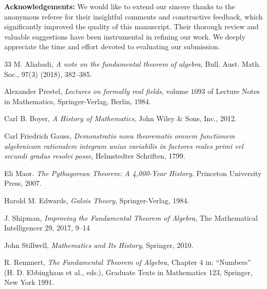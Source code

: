 \documentclass[sn-mathphys-num]{sn-jnl}%
\begin{document}
\noindent 
\textbf{Acknowledgements:} We would like to extend our sincere thanks to the anonymous referee for their insightful comments and constructive feedback, which significantly improved the quality of this manuscript. Their thorough review and valuable suggestions have been instrumental in refining our work. We deeply appreciate the time and effort devoted to evaluating our submission.

\begin{thebibliography}{33}
 M. Aliabadi, {\it A note on the fundamental theorem of algebra}, Bull. Aust. Math. Soc., 97(3) (2018), 382–385.

 Alexander Prestel, {\it Lectures on formally real fields}, volume $1093$ of Lecture Notes in Mathematics, Springer-Verlag, Berlin, $1984$.

 Carl B. Boyer, {\it A History of Mathematics}, John Wiley \& Sons, Inc., 2012.


 Carl Friedrich Gauss, {\it Demonstratio nova theorematis omnem functionem algebraicam rationalem integram unius variabilis in factores reales primi vel secundi gradus resolvi posse}, Helmstedter Schriften, 1799.

Eli Maor. {\it The Pythagorean Theorem: A 4,000-Year History}. Princeton University Press, 2007. %

 Harold M. Edwards, {\it Galois Theory}, Springer-Verlag, 1984.

 J. Shipman, {\it Improving the Fundamental Theorem of Algebra}, The Mathematical Intelligencer 29, 2017, 9–14 

 John Stillwell, {\it Mathematics and Its History}, Springer, 2010.



 R. Remmert, {\it The Fundamental Theorem of Algebra}, Chapter 4 in: “Numbers” (H. D. Ebbinghaus et al., eds.), Graduate Texts in Mathematics 123, Springer, New York 1991.


\end{thebibliography}
\end{document}
